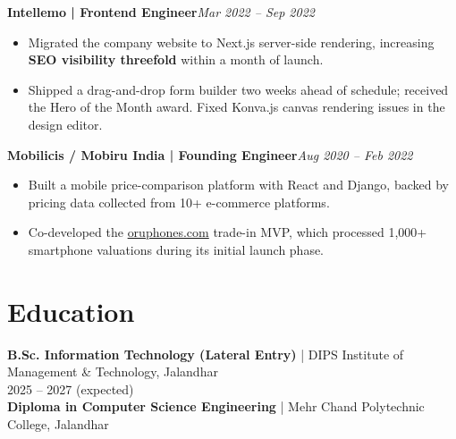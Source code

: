 \documentclass[a4paper,10pt]{article}
\newcommand{\job}[2]{\textbf{#1}\hfill\textit{#2}}
\begin{document}
\job{Intellemo | Frontend Engineer}{Mar 2022 -- Sep 2022}
\begin{itemize}
\item Migrated the company website to Next.js server-side rendering, increasing \textbf{SEO visibility threefold} within a month of launch.
\item Shipped a drag-and-drop form builder two weeks ahead of schedule; received the Hero of the Month award. Fixed Konva.js canvas rendering issues in the design editor.
\end{itemize}
\job{Mobilicis / Mobiru India | Founding Engineer}{Aug 2020 -- Feb 2022}
\begin{itemize}
\item Built a mobile price-comparison platform with React and Django, backed by pricing data collected from 10+ e-commerce platforms.
\item Co-developed the \href{https://www.oruphones.com}{oruphones.com} trade-in MVP, which processed 1,000+ smartphone valuations during its initial launch phase.
\end{itemize}
\section{Education}
\textbf{B.Sc. Information Technology (Lateral Entry)} | DIPS Institute of Management \& Technology, Jalandhar\\
2025 -- 2027 (expected)\\
\textbf{Diploma in Computer Science Engineering} | Mehr Chand Polytechnic College, Jalandhar
\end{document}
